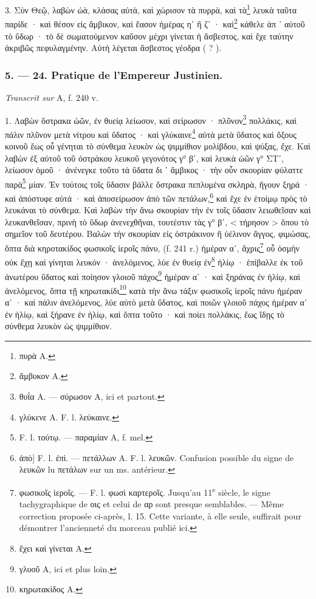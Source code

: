 \documentclass[a4paper, 11pt, oneside, polutonikogreek, french]{article}
\begin{document}
3. Σὺν Θεῷ, λαβὼν ὠὰ, κλάσας αὐτὰ, καὶ χώρισον τὰ πυρρὰ, καὶ τὰ\footnote{πυρὰ A.} λευκὰ ταῦτα παρίδε · καὶ θέσον εἰς ἄμβικον, καὶ ἔασον ἡμέρας ηʹ ἢ ζʹ · καὶ\footnote{ἄμβυκον A.} κάθελε ἀπ ᾽ αὐτοῦ τὸ ὕδωρ · τὸ δὲ σωματούμενον καῦσον μέχρι γίνεται ἡ ἄσβεστος, καὶ ἔχε ταύτην ἀκριβῶς πεφυλαγμένην. Αὐτὴ λέγεται ἄσβεστος γέοδρα ( ? ).

\bigskip
\centerline{\EightStarTaper}
\centerline{\EightStarTaper\EightStarTaper}
\bigskip

\subsubsection{5. --- 24. Pratique de l'Empereur Justinien.}

\emph{Transcrit sur} A, f. 240 v.

\bigskip

1. Λαβὼν ὄστρακα ὠῶν, ἐν θυείᾳ λείωσον, καὶ σείρωσον · πλῦνον\footnote{θυΐα A. --- σύρωσον A, ici et partout.} πολλάκις, καὶ πάλιν πλῦνον μετὰ νίτρου καὶ ὕδατος · καὶ γλύκαινε\footnote{γλύκενε A. F. l. λεύκαινε.} αὐτὰ μετὰ ὕδατος καὶ ὄξους κοινοῦ ἕως οὗ γένηται τὸ σύνθεμα λευκὸν ὡς ψιμμίθιον μολίβδου, καὶ ψύξας, ἔχε. Καὶ λαβὼν ἐξ αὐτοῦ τοῦ ὀστράκου λευκοῦ γεγονότος γ° βʹ, καὶ λευκὰ ὠῶν γ° ΣΤʹ, λείωσον ὁμοῦ · ἀνένεγκε τοῦτο τὰ ὕδατα δι ᾽ ἄμβικος · τὴν οὖν σκουρίαν φύλαττε παρὰ\footnote{F. l. τούτῳ. --- παραμίαν A, f. mel.} μίαν. Ἐν τούτοις τοῖς ὕδασιν βάλλε ὄστρακα πεπλυμένα σκληρὰ, ἤγουν ξηρά · καὶ ἀπόστυφε αὐτά · καὶ ἀποσείρωσον ἀπὸ τῶν πετάλων,\footnote{ἀπὸ] F. l. ἐπὶ. --- πετάλλων A. F. l. λευκῶν. Confusion possible du signe de λευκῶν lu πετάλων sur un ms. antérieur.} καὶ ἔχε ἐν ἑτοίμῳ πρὸς τὸ λευκάναι τὸ σύνθεμα. Καὶ λαβὼν τὴν ἄνω σκουρίαν τὴν ἐν τοῖς ὕδασιν λειωθεῖσαν καὶ λευκανθεῖσαν, πρινὴ τὸ ὕδωρ ἀνενεχθῆναι, τουτέστιν τὰς γ° βʹ, < τήρησον > ὅπου τὸ σημεῖον τοῦ δευτέρου. Βαλὼν τὴν σκουρίαν εἰς ὀστράκινον ἢ ὑέλινον ἄγγος, φιμώσας, ὄπτα διὰ κηροτακίδος φωσικοῖς ἱεροῖς πάνυ, (f. 241 r.) ἡμέραν αʹ, ἄχρις\footnote{φωσικοῖς ἱεροῖς. --- F. l. φωσὶ καρτεροῖς. Jusqu'au 11\textsuperscript{e} siècle, le signe tachygraphique de οις et celui de αρ sont presque semblables. --- Même correction proposée ci-après, l. 15. Cette variante, à elle seule, suffirait pour démontrer l'ancienneté du morceau publié ici.} οὗ ὀσμὴν οὐκ ἔχῃ καὶ γίνηται λευκόν · ἀνελόμενος, λύε ἐν θυείᾳ ἐν\footnote{ἔχει καὶ γίνεται A.} ἡλίῳ · ἐπίβαλλε ἐκ τοῦ ἀνωτέρου ὕδατος καὶ ποίησον γλοιοῦ πάχος\footnote{γλυοῦ A, ici et plus loin.} ἡμέραν αʹ · καὶ ξηράνας ἐν ἡλίῳ, καὶ ἀνελόμενος, ὄπτα τῇ κηρωτακίδι\footnote{κηρωτακίδος A.} κατὰ τὴν ἄνω τάξιν φωσικοῖς ἱεροῖς πάνυ ἡμέραν αʹ · καὶ πάλιν ἀνελόμενος, λύε αὐτὸ μετὰ ὕδατος, καὶ ποιῶν γλοιοῦ πάχος ἡμέραν αʹ ἐν ἡλίῳ, καὶ ξήρανε ἐν ἡλίῳ, καὶ ὄπτα τοῦτο · καὶ ποίει πολλάκις, ἕως ἴδῃς τὸ σύνθεμα λευκὸν ὡς ψιμμίθιον.
\end{document}
